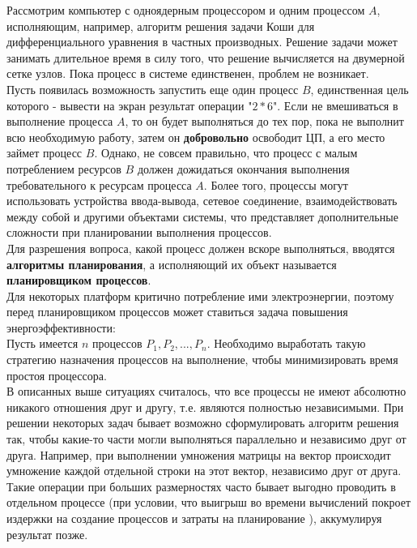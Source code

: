 Рассмотрим компьютер с одноядерным процессором и одним процессом $A$, исполняющим, например, алгоритм решения задачи Коши для дифференциального уравнения в частных производных. Решение задачи может занимать длительное время в силу того, что решение вычисляется на двумерной сетке узлов. Пока процесс в системе единственен, проблем не возникает. \\ Пусть появилась возможность запустить еще один процесс $B$, единственная цель которого - вывести на экран результат операции "$2 * 6$". Если не вмешиваться в выполнение  процесса $A$, то он будет выполняться до тех пор, пока не выполнит всю необходимую работу, затем он \textbf{добровольно} освободит ЦП, а его место займет процесс $B$. Однако, не совсем правильно, что процесс с малым потреблением ресурсов $B$  должен дожидаться окончания выполнения требовательного к ресурсам процесса $A$. Более того, процессы могут использовать устройства ввода-вывода, сетевое соединение, взаимодействовать между собой и другими объектами системы, что представляет дополнительные сложности при планировании выполнения процессов.\\

Для разрешения вопроса, какой процесс должен вскоре выполняться, вводятся \textbf{алгоритмы планирования}, а исполняющий их объект называется \textbf{планировщиком процессов}.
\\
Для некоторых платформ критично потребление ими электроэнергии, поэтому перед планировщиком процессов может ставиться задача повышения энергоэффективности:\\
Пусть имеется $n$ процессов $P_1, P_2, ... , P_n$. Необходимо выработать такую стратегию назначения процессов на выполнение, чтобы минимизировать время простоя процессора.\\
В описанных выше ситуациях считалось, что все процессы не имеют абсолютно никакого отношения друг и другу, т.е. являются полностью независимыми. При решении некоторых задач бывает возможно сформулировать алгоритм решения так, чтобы какие-то части могли выполняться параллельно и независимо друг от друга. Например, при выполнении умножения матрицы на вектор происходит умножение каждой отдельной строки на этот вектор, независимо друг от друга. Такие операции при больших размерностях часто бывает выгодно проводить в отдельном процессе (при условии, что выигрыш во времени вычислений покроет издержки на создание процессов и затраты на планирование ), аккумулируя результат позже.
